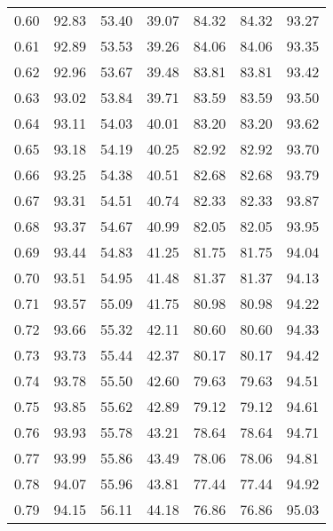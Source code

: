 \begin{tabular}{|c|c|c|c|c|c|c|}
      0.60 &     92.83 &     53.40 &      39.07 &   84.32 &      84.32 &         93.27 \\
      0.61 &     92.89 &     53.53 &      39.26 &   84.06 &      84.06 &         93.35 \\
      0.62 &     92.96 &     53.67 &      39.48 &   83.81 &      83.81 &         93.42 \\
      0.63 &     93.02 &     53.84 &      39.71 &   83.59 &      83.59 &         93.50 \\
      0.64 &     93.11 &     54.03 &      40.01 &   83.20 &      83.20 &         93.62 \\
      0.65 &     93.18 &     54.19 &      40.25 &   82.92 &      82.92 &         93.70 \\
      0.66 &     93.25 &     54.38 &      40.51 &   82.68 &      82.68 &         93.79 \\
      0.67 &     93.31 &     54.51 &      40.74 &   82.33 &      82.33 &         93.87 \\
      0.68 &     93.37 &     54.67 &      40.99 &   82.05 &      82.05 &         93.95 \\
      0.69 &     93.44 &     54.83 &      41.25 &   81.75 &      81.75 &         94.04 \\
      0.70 &     93.51 &     54.95 &      41.48 &   81.37 &      81.37 &         94.13 \\
      0.71 &     93.57 &     55.09 &      41.75 &   80.98 &      80.98 &         94.22 \\
      0.72 &     93.66 &     55.32 &      42.11 &   80.60 &      80.60 &         94.33 \\
      0.73 &     93.73 &     55.44 &      42.37 &   80.17 &      80.17 &         94.42 \\
      0.74 &     93.78 &     55.50 &      42.60 &   79.63 &      79.63 &         94.51 \\
      0.75 &     93.85 &     55.62 &      42.89 &   79.12 &      79.12 &         94.61 \\
      0.76 &     93.93 &     55.78 &      43.21 &   78.64 &      78.64 &         94.71 \\
      0.77 &     93.99 &     55.86 &      43.49 &   78.06 &      78.06 &         94.81 \\
      0.78 &     94.07 &     55.96 &      43.81 &   77.44 &      77.44 &         94.92 \\
      0.79 &     94.15 &     56.11 &      44.18 &   76.86 &      76.86 &         95.03 \\

\end{tabular}

